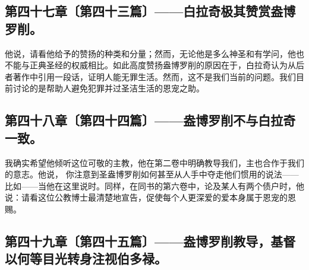 
\subsection{第四十七章〔第四十三篇〕——白拉奇极其赞赏盎博罗削。}

他说，请看他给予的赞扬的种类和分量；然而，无论他是多么神圣和有学问，他也不能与正典圣经的权威相比。如此高度赞扬盎博罗削的原因在于，白拉奇认为从后者著作中引用一段话，证明人能无罪生活。然而，这不是我们当前的问题。我们目前讨论的是帮助人避免犯罪并过圣洁生活的恩宠之助。\par


\subsection{第四十八章〔第四十四篇〕——盎博罗削不与白拉奇一致。}

我确实希望他倾听这位可敬的主教，他在第二卷中明确教导我们，主也合作于我们的意志。他说， 你注意到圣盎博罗削如何甚至从人手中夺走他们惯用的说法——比如——当他在这里说时。同样，在同书的第六卷中，论及某人有两个债户时，他说：请看这位公教博士最清楚地宣告，促使每个人更深爱的爱本身属于恩宠的恩赐。\par


\subsection{第四十九章〔第四十五篇〕——盎博罗削教导，基督以何等目光转身注视伯多禄。}

